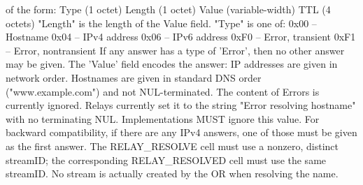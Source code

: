 of the form:
Type (1 octet)
Length (1 octet)
Value (variable-width)
TTL (4 octets)
"Length" is the length of the Value field.
"Type" is one of:
0x00 -- Hostname
0x04 -- IPv4 address
0x06 -- IPv6 address
0xF0 -- Error, transient
0xF1 -- Error, nontransient
If any answer has a type of 'Error', then no other answer may be
given.
The 'Value' field encodes the answer:
IP addresses are given in network order.
Hostnames are given in standard DNS order ("www.example.com")
and not NUL-terminated.
The content of Errors is currently ignored. Relays currently
set it to the string "Error resolving hostname" with no
terminating NUL. Implementations MUST ignore this value.
For backward compatibility, if there are any IPv4 answers, one of those
must be given as the first answer.
The RELAY_RESOLVE cell must use a nonzero, distinct streamID; the
corresponding RELAY_RESOLVED cell must use the same streamID. No stream
is actually created by the OR when resolving the name.